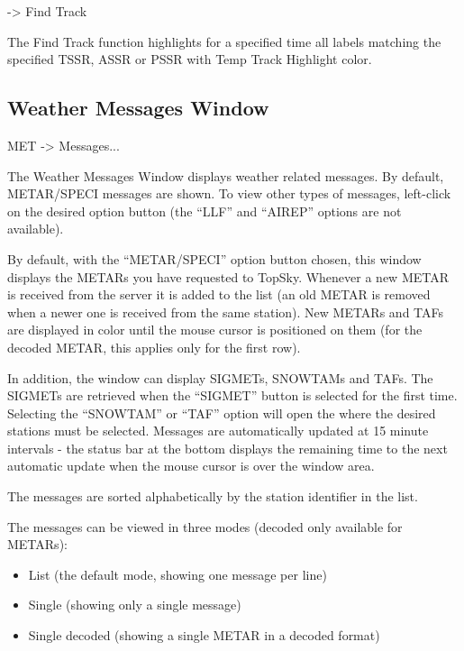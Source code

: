 \documentclass[a4paper,oneside,11pt]{memoir}
\begin{document}
 -> Find Track 

\bigskip

The Find Track function highlights for a specified time all labels matching the specified TSSR, ASSR or PSSR with Temp Track Highlight color.

\subsection{Weather Messages Window}
\label{win:wxmw}

 MET -> Messages...

\bigskip


The Weather Messages Window displays weather related messages. By default, METAR/SPECI messages are shown. To view other types of messages, left-click on the desired option button (the “LLF” and “AIREP” options are not available).

\bigskip

By default, with the “METAR/SPECI” option button chosen, this window displays the METARs you have requested to TopSky. Whenever a new METAR is received from the server it is added to the list (an old METAR is removed when a newer one is received from the same station). New METARs and TAFs are displayed in  color until the mouse cursor is positioned on them (for the decoded METAR, this applies only for the first row).

\bigskip

In addition, the window can display SIGMETs, SNOWTAMs and TAFs. The SIGMETs are retrieved when the “SIGMET” button is selected for the first time. Selecting the “SNOWTAM” or “TAF” option will open the  where the desired stations must be selected. Messages are automatically updated at 15 minute intervals - the status bar at the bottom displays the remaining time to the next automatic update when the mouse cursor is over the window area.

\bigskip

The messages are sorted alphabetically by the station identifier in the list.

\bigskip

The messages can be viewed in three modes (decoded only available for METARs):

\begin{itemize}
    \item List (the default mode, showing one message per line)
    \item Single (showing only a single message)
    \item Single decoded (showing a single METAR in a decoded format)
\end{itemize}
\end{document}
